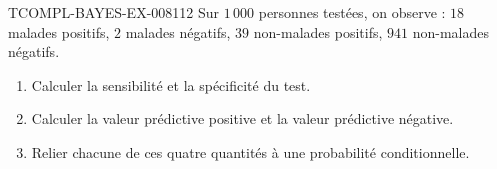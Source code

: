 \begin{exercice}{TCOMPL-BAYES-EX-008}{1}{12}
Sur $1\,000$ personnes testées, on observe : $18$ malades positifs, $2$
malades négatifs, $39$ non-malades positifs, $941$ non-malades négatifs.
\begin{enumerate}
  \item Calculer la sensibilité et la spécificité du test.
  \item Calculer la valeur prédictive positive et la valeur prédictive
        négative.
  \item Relier chacune de ces quatre quantités à une probabilité
        conditionnelle.
\end{enumerate}
\end{exercice}
